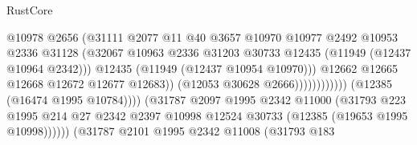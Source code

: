 \begin{lexlean}{RustCore}
\begin{coremodule}
                                                    @10978
                                                    @2656
                                                    (@31111
                                                      @2077
                                                      @11
                                                      @40
                                                      @3657
                                                      @10970
                                                      @10977
                                                      @2492
                                                      @10953
                                                      @2336
                                                      @31128
                                                      (@32067
                                                        @10963
                                                        @2336
                                                        @31203
                                                        @30733
                                                        @12435
                                                        (@11949 (@12437 @10964 @2342)))
                                                      @12435
                                                      (@11949 (@12437 @10954 @10970)))
                                                    @12662
                                                    @12665
                                                    @12668
                                                    @12672
                                                    @12677
                                                    @12683))
                                                (@12053 @30628 @2666))))))))))))
                          (@12385 (@16474 @1995 @10784))))
                      (@31787
                        @2097
                        @1995
                        @2342
                        @11000
                        (@31793
                          @223
                          @1995
                          @214
                          @27
                          @2342
                          @2397
                          @10998
                          @12524
                          @30733
                          (@12385 (@19653 @1995 @10998))))))
                  (@31787
                    @2101
                    @1995
                    @2342
                    @11008
                    (@31793
                      @183

\end{coremodule}
\end{lexlean}
